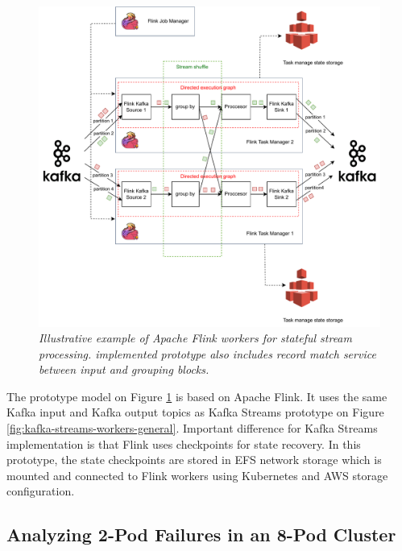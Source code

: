 \begin{figure}[H]
    \centering
    \includegraphics[width=1\textwidth]{figures/flink/flink-shuffle-workers}
    \caption{\textit{Illustrative example of Apache Flink workers for stateful stream processing.
    implemented prototype also includes record match service between input and grouping blocks.}}
    \label{fig:flink-workers-general}
\end{figure}

The prototype model on Figure \ref{fig:flink-workers-general} is based on Apache Flink.
It uses the same Kafka input and Kafka output topics as Kafka Streams prototype on Figure \ref{fig:kafka-streams-workers-general}.
Important difference for Kafka Streams implementation is that Flink uses checkpoints for
state recovery.
In this prototype, the state checkpoints are stored in EFS network storage which is mounted and connected to
Flink workers using Kubernetes and AWS storage configuration.


\subsection{Analyzing 2-Pod Failures in an 8-Pod Cluster}\label{subsec:analyzing-2-pod-failures-in-an-8-pod-cluster2}


